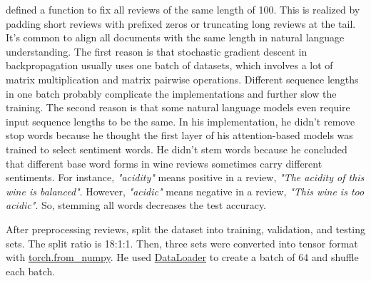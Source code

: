 \documentclass[aoas]{imsart}
\numberwithin{equation}{section}
\theoremstyle{plain}
\theoremstyle{remark}
\begin{document}
\cite{chenyu} defined a function to fix all reviews of the same length of 100. This is realized by padding short reviews with prefixed zeros or truncating long reviews at the tail. It's common to align all documents with the same length in natural language understanding. The first reason is that stochastic gradient descent in backpropagation usually uses one batch of datasets, which involves a lot of matrix multiplication and matrix pairwise operations. Different sequence lengths in one batch probably complicate the implementations and further slow the training. The second reason is that some natural language models even require input sequence lengths to be the same. In his implementation, he didn't remove stop words because he thought the first layer of his attention-based models was trained to select sentiment words. He didn't stem words because he concluded that different base word forms in wine reviews sometimes carry different sentiments. For instance, \textit{"acidity"} means positive in a review, \textit{"The acidity of this wine is balanced"}. However, \textit{"acidic"} means negative in a review, \textit{"This wine is too acidic"}. So, stemming all words decreases the test accuracy. 

After preprocessing reviews, \cite{chenyu} split the dataset into training, validation, and testing sets. The split ratio is 18:1:1. Then, three sets were converted into tensor format with \href{https://pytorch.org/docs/stable/generated/torch.from_numpy.html}{torch.from\_numpy}. He used \href{https://pytorch.org/tutorials/beginner/basics/data_tutorial.html}{DataLoader} to create a batch of 64 and shuffle each batch. 
\end{document}
